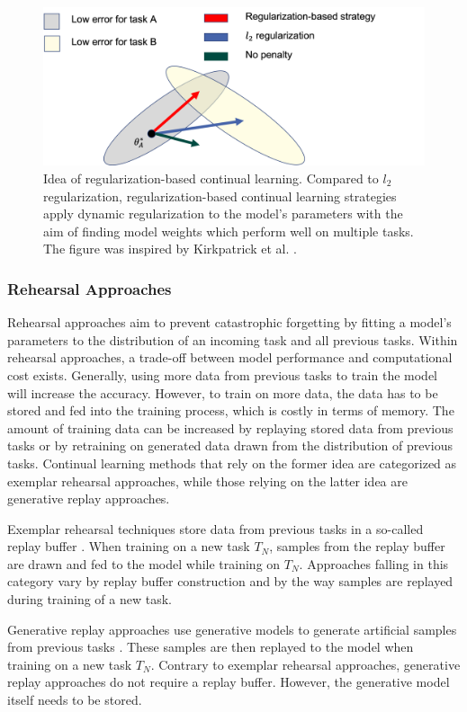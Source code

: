 \begin{figure} [ht]
    \centering
    \label{fig:ContinualLearning:ReulgarizationIdea}
    \includegraphics[width=.9\linewidth]{images/regularization_idea.png}
    \caption[Idea of regularization-based continual learning]{Idea of regularization-based continual learning. Compared to $l_2$ regularization,
    regularization-based continual learning strategies apply dynamic regularization to the model's parameters with the aim of finding model
    weights which perform well on multiple tasks. The figure was inspired by Kirkpatrick et al. \cite{kirkpatrick2017overcoming}.}
  \end{figure}

\subsubsection{Rehearsal Approaches}
\label{sec:RehearsalApproaches}
Rehearsal approaches aim to prevent catastrophic forgetting by fitting a model's parameters to the distribution
of an incoming task and all previous tasks. Within rehearsal approaches, a trade-off between
model performance and computational cost exists. Generally, using more data from previous tasks to train the model will increase the accuracy. 
However, to train on more data, the data has to be stored and fed into the training process, which is costly in terms of memory.
The amount of training data can be increased by replaying stored data from previous tasks or by
retraining on generated data drawn from the distribution of previous tasks. Continual learning methods that rely on the former idea are
categorized as exemplar rehearsal approaches, while those relying on the latter idea are generative replay
approaches. \par
Exemplar rehearsal techniques store data from previous tasks in a so-called replay buffer \cite{chaudhry2018efficient}. When training on a new task $T_N$, samples
from the replay buffer are drawn and fed to the model while training on $T_N$. Approaches falling in this category vary by replay buffer
construction and by the way samples are replayed during training of a new task. \par
Generative replay approaches use generative models to generate artificial samples from previous tasks \cite{shin2017continual}. These samples are then replayed to
the model when training on a new task $T_N$. Contrary to exemplar rehearsal approaches, generative replay approaches do not require a replay buffer.
However, the generative model itself needs to be stored. 

